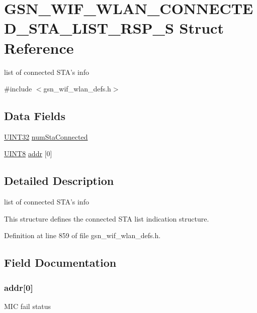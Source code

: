 \hypertarget{a00375}{
\section{GSN\_\-WIF\_\-WLAN\_\-CONNECTED\_\-STA\_\-LIST\_\-RSP\_\-S Struct Reference}
\label{a00375}
}


list of connected STA's info  




{\ttfamily \#include $<$gsn\_\-wif\_\-wlan\_\-defs.h$>$}

\subsection*{Data Fields}
\begin{DoxyCompactItemize}
\item 
\hyperlink{a00660_gae1e6edbbc26d6fbc71a90190d0266018}{UINT32} \hyperlink{a00375_a2547404f8dfae54bf7a79a5852a2eb4d}{numStaConnected}
\item 
\hyperlink{a00660_gab27e9918b538ce9d8ca692479b375b6a}{UINT8} \hyperlink{a00375_aa93e35ccd9bd20a1eeb1f442b8cee61b}{addr} \mbox{[}0\mbox{]}
\end{DoxyCompactItemize}


\subsection{Detailed Description}
list of connected STA's info 

This structure defines the connected STA list indication structure. 

Definition at line 859 of file gsn\_\-wif\_\-wlan\_\-defs.h.



\subsection{Field Documentation}
\hypertarget{a00375_aa93e35ccd9bd20a1eeb1f442b8cee61b}{
\subsubsection[{addr}]{ {\bf addr}\mbox{[}0\mbox{]}}}
\label{a00375_aa93e35ccd9bd20a1eeb1f442b8cee61b}
MIC fail status 

